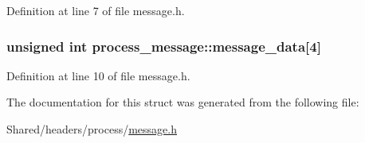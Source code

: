 Definition at line 7 of file message.h.

\hypertarget{structprocess__message_ae605af7258e98fe38daeefccda5ea30b}{
\subsubsection[{message\_\-data}]{\setlength{\rightskip}{0pt plus 5cm}unsigned int {\bf process\_\-message::message\_\-data}\mbox{[}4\mbox{]}}}
\label{structprocess__message_ae605af7258e98fe38daeefccda5ea30b}


Definition at line 10 of file message.h.



The documentation for this struct was generated from the following file:\begin{DoxyCompactItemize}
\item 
Shared/headers/process/\hyperlink{message_8h}{message.h}\end{DoxyCompactItemize}
